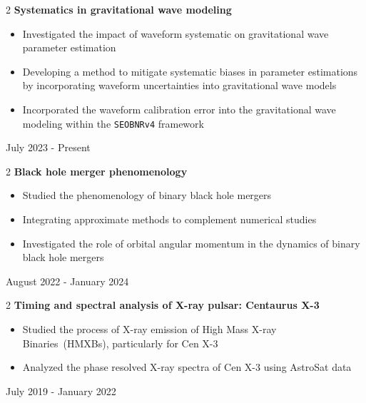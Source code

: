 \documentclass[10pt, letterpaper]{article}
\newenvironment{highlights}{
    \begin{itemize}[
        topsep=0.10 cm,
        parsep=0.10 cm,
        partopsep=0pt,
        itemsep=0pt,
        leftmargin=0.4 cm + 10pt
    ]
}{
    \end{itemize}
}
\newenvironment{twocolentry}[2][]{
    \onecolentry
    \def\secondColumn{#2}
    \setcolumnwidth{\fill, 3.5 cm}
    \begin{paracol}{2}
}{
    \switchcolumn \raggedleft \secondColumn
    \end{paracol}
    \endonecolentry
}
\begin{document}
\vspace{0.2 cm}

\begin{twocolentry}{July 2023 - Present}{\textbf{Systematics in gravitational wave modeling}}
    \begin{highlights}
        \item Investigated the impact of waveform systematic on gravitational wave parameter estimation
        \item Developing a method to mitigate systematic biases in parameter estimations by incorporating 
        waveform uncertainties into gravitational wave models
        \item Incorporated the waveform calibration error into the gravitational wave modeling within 
        the \texttt{SEOBNRv4} framework
    \end{highlights}
\end{twocolentry}

\vspace{0.2 cm}

\begin{twocolentry}{August 2022 - January 2024}{\textbf{Black hole merger phenomenology}}
    \begin{highlights}
        \item Studied the phenomenology of binary black hole mergers
        \item Integrating approximate methods to complement numerical studies
        \item Investigated the role of orbital angular momentum in the dynamics of binary black hole mergers
    \end{highlights}
\end{twocolentry}

\vspace{0.2 cm}

\begin{twocolentry}{July 2019 - January 2022}{\textbf{Timing and spectral analysis of X-ray pulsar: Centaurus X-3}}
    \begin{highlights}
        \item Studied the process of X-ray emission of High Mass X-ray Binaries~(HMXBs), particularly for Cen X-3
        \item Analyzed the phase resolved X-ray spectra of Cen X-3 using AstroSat data
    \end{highlights}
\end{twocolentry}

\end{document}

